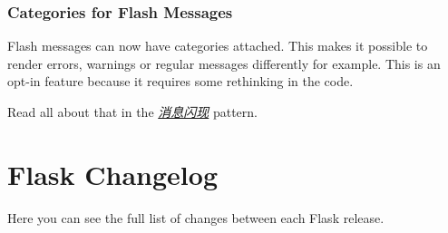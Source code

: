 \documentclass[a4paper,12pt]{sphinxmanual}
\begin{document}
\subsection{Categories for Flash Messages}
\label{upgrading:categories-for-flash-messages}
Flash messages can now have categories attached.  This makes it possible
to render errors, warnings or regular messages differently for example.
This is an opt-in feature because it requires some rethinking in the code.

Read all about that in the {\hyperref[patterns/flashing:message-flashing-pattern]{\emph{消息闪现}}} pattern.


\chapter{Flask Changelog}
\label{changelog::doc}\label{changelog:flask-changelog}
Here you can see the full list of changes between each Flask release.
\end{document}
